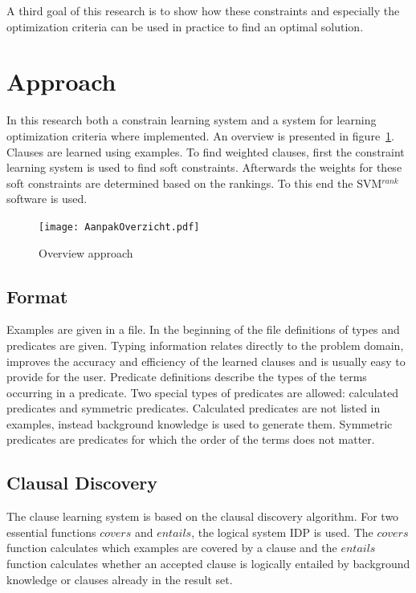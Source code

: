 \documentclass{llncs}
\newcommand{\svm}{SVM$^{rank}$}
\begin{document}
A third goal of this research is to show how these constraints and especially the optimization criteria can be used in practice to find an optimal solution.

\section{Approach}
In this research both a constrain learning system and a system for learning optimization criteria where implemented.
An overview is presented in figure~\ref{fig:struktuur}.
Clauses are learned using examples.
To find weighted clauses, first the constraint learning system is used to find soft constraints.
Afterwards the weights for these soft constraints are determined based on the rankings.
To this end the \svm software is used.

\begin{figure}

  \centering
    \texttt{[image: AanpakOverzicht.pdf]}
  \caption{Overview approach}
  \label{fig:struktuur}

\end{figure}

\subsection{Format}
Examples are given in a file.
In the beginning of the file definitions of types and predicates are given.
Typing information relates directly to the problem domain, improves the accuracy and efficiency of the learned clauses and is usually easy to provide for the user.
Predicate definitions describe the types of the terms occurring in a predicate.
Two special types of predicates are allowed: calculated predicates and symmetric predicates.
Calculated predicates are not listed in examples, instead background knowledge is used to generate them.
Symmetric predicates are predicates for which the order of the terms does not matter.

\subsection{Clausal Discovery}
The clause learning system is based on the clausal discovery algorithm.
For two essential functions $\mathit{covers}$ and $\mathit{entails}$, the logical system IDP is used.
The $\mathit{covers}$ function calculates which examples are covered by a clause and the $\mathit{entails}$ function calculates whether an accepted clause is logically entailed by background knowledge or clauses already in the result set.
\end{document}
